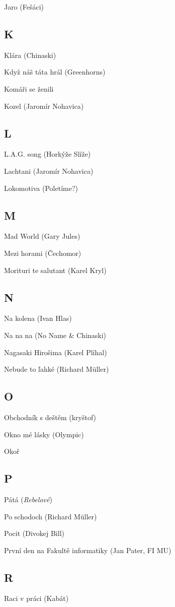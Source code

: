 \begin{multicols}{2}
Jaro (Fešáci)

\subsection*{K}
Klára (Chinaski)

Když náš táta hrál (Greenhorns)

Komáři se ženili

Kozel (Jaromír Nohavica)

\subsection*{L}
L.A.G. song (Horkýže Slíže)

Lachtani (Jaromír Nohavica)

Lokomotiva (Poletíme?)

\subsection*{M}
Mad World (Gary Jules)

Mezi horami (Čechomor)

Morituri te salutant (Karel Kryl)

\subsection*{N}
Na kolena (Ivan Hlas)

Na na na (No Name \& Chinaski)

Nagasaki Hirošima (Karel Plíhal)

Nebude to ľahké (Richard Müller)

\subsection*{O}
Obchodník s deštěm (kryštof)

Okno mé lásky (Olympic)

Okoř

\subsection*{P}
Pátá (\emph{Rebelové})

Po schodoch (Richard Müller)

Pocit (Divokej Bill)

První den na Fakultě informatiky (Jan Pater, FI MU)

\subsection*{R}
Raci v práci (Kabát)


\end{multicols}
